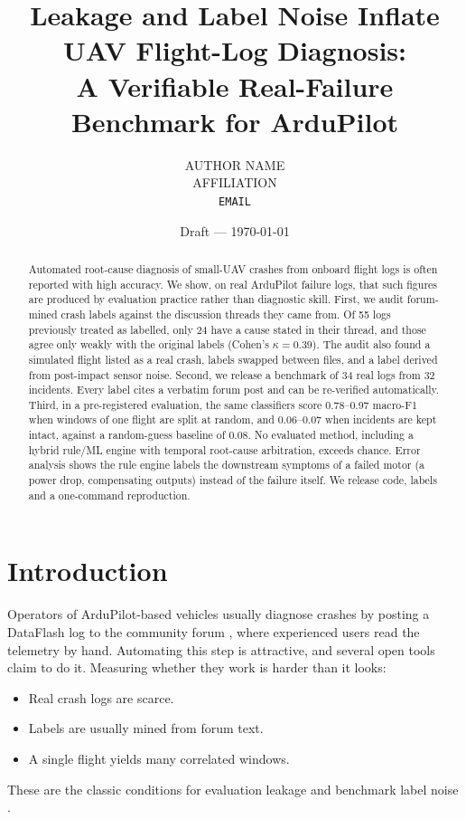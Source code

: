 \documentclass[10pt,a4paper]{article}
\title{Leakage and Label Noise Inflate UAV Flight-Log Diagnosis:\\
A Verifiable Real-Failure Benchmark for ArduPilot}
\author{AUTHOR NAME\\ AFFILIATION\\ \texttt{EMAIL}}
\date{Draft --- \today}
\begin{document}
\maketitle

\begin{abstract}
Automated root-cause diagnosis of small-UAV crashes from onboard flight logs
is often reported with high accuracy. We show, on real ArduPilot failure logs,
that such figures are produced by evaluation practice rather than diagnostic
skill. First, we audit forum-mined crash labels against the discussion
threads they came from. Of 55 logs previously treated as labelled, only 24
have a cause stated in their thread, and those agree only weakly with the
original labels (Cohen's $\kappa = 0.39$). The audit also found a simulated
flight listed as a real crash, labels swapped between files, and a label
derived from post-impact sensor noise. Second, we release a benchmark of
34 real logs from 32 incidents. Every label cites a verbatim forum post and
can be re-verified automatically. Third, in a pre-registered evaluation, the
same classifiers score 0.78--0.97 macro-F1 when windows of one flight are
split at random, and 0.06--0.07 when incidents are kept intact, against a
random-guess baseline of 0.08. No evaluated method, including a hybrid
rule/ML engine with temporal root-cause arbitration, exceeds chance. Error
analysis shows the rule engine labels the downstream symptoms of a failed
motor (a power drop, compensating outputs) instead of the failure itself.
We release code, labels and a one-command reproduction.
\end{abstract}

\section{Introduction}
Operators of ArduPilot-based vehicles \citep{ardupilot} usually diagnose
crashes by posting a DataFlash log to the community forum
\citep{ardupilotforum}, where experienced users read the telemetry by hand.
Automating this step is attractive, and several open tools claim to do it.
Measuring whether they work is harder than it looks:
\begin{itemize}
\item Real crash logs are scarce.
\item Labels are usually mined from forum text.
\item A single flight yields many correlated windows.
\end{itemize}
These are the classic conditions for evaluation leakage
\citep{kapoor2023leakage} and benchmark label noise
\citep{northcutt2021labelerrors}.
\end{document}
